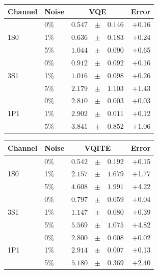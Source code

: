 \documentclass[11pt,a4paper]{article}
\begin{document}
\begin{center}
\small
\begin{tabular}{@{}l l r@{\;\;}c@{\;\;}l r@{}}
\toprule
Channel & Noise & \multicolumn{3}{c}{VQE} & Error \\
\midrule
\multirow{3}{*}{1S0}
  & 0\%  & $0.547$ & $\pm$ & $0.146$ & $+$0.16 \\
  & 1\%  & $0.636$ & $\pm$ & $0.183$ & $+$0.24 \\
  & 5\%  & $1.044$ & $\pm$ & $0.090$ & $+$0.65 \\
\midrule
\multirow{3}{*}{3S1}
  & 0\%  & $0.912$ & $\pm$ & $0.092$ & $+$0.16 \\
  & 1\%  & $1.016$ & $\pm$ & $0.098$ & $+$0.26 \\
  & 5\%  & $2.179$ & $\pm$ & $1.103$ & $+$1.43 \\
\midrule
\multirow{3}{*}{1P1}
  & 0\%  & $2.810$ & $\pm$ & $0.003$ & $+$0.03 \\
  & 1\%  & $2.902$ & $\pm$ & $0.011$ & $+$0.12 \\
  & 5\%  & $3.841$ & $\pm$ & $0.852$ & $+$1.06 \\
\bottomrule
\end{tabular}
\hspace{1em}
\begin{tabular}{@{}l l r@{\;\;}c@{\;\;}l r@{}}
\toprule
Channel & Noise & \multicolumn{3}{c}{VQITE} & Error \\
\midrule
\multirow{3}{*}{1S0}
  & 0\%  & $0.542$ & $\pm$ & $0.192$ & $+$0.15 \\
  & 1\%  & $2.157$ & $\pm$ & $1.679$ & $+$1.77 \\
  & 5\%  & $4.608$ & $\pm$ & $1.991$ & $+$4.22 \\
\midrule
\multirow{3}{*}{3S1}
  & 0\%  & $0.797$ & $\pm$ & $0.059$ & $+$0.04 \\
  & 1\%  & $1.147$ & $\pm$ & $0.080$ & $+$0.39 \\
  & 5\%  & $5.569$ & $\pm$ & $1.075$ & $+$4.82 \\
\midrule
\multirow{3}{*}{1P1}
  & 0\%  & $2.800$ & $\pm$ & $0.008$ & $+$0.02 \\
  & 1\%  & $2.914$ & $\pm$ & $0.007$ & $+$0.13 \\
  & 5\%  & $5.180$ & $\pm$ & $0.369$ & $+$2.40 \\
\bottomrule
\end{tabular}
\end{center}
\end{document}
